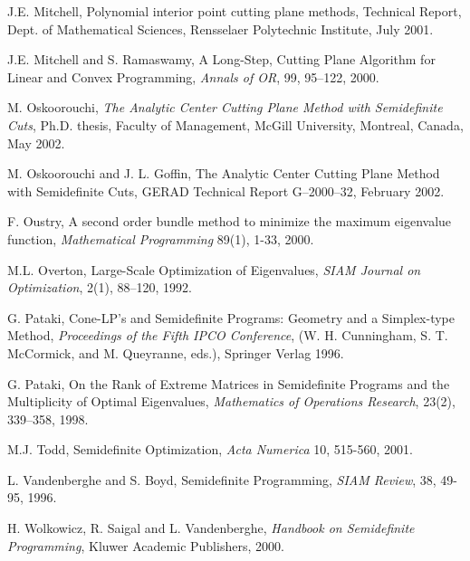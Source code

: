 \documentclass[12pt]{kluwer}
\begin{document}
\begin{article}
\begin{thebibliography}{55}
J.E. Mitchell,
Polynomial interior point cutting plane methods,
Technical Report, Dept. of Mathematical Sciences,
Rensselaer Polytechnic Institute, July 2001.

J.E. Mitchell and S. Ramaswamy,
A Long-Step, Cutting Plane Algorithm for Linear and Convex Programming,
{\em Annals of OR}, 99, 95--122, 2000.

M. Oskoorouchi,
{\em The Analytic Center Cutting Plane Method with Semidefinite Cuts},
Ph.D. thesis,
Faculty of Management, McGill University, Montreal, Canada, May 2002.

M. Oskoorouchi and J. L. Goffin,
The Analytic Center Cutting Plane Method with Semidefinite Cuts,
GERAD Technical Report G--2000--32, February 2002.

 F. Oustry,
A second order bundle method to minimize the maximum eigenvalue function,
{\em Mathematical Programming} 89(1), 1-33, 2000.

 M.L. Overton,
Large-Scale Optimization of Eigenvalues,
{\em SIAM Journal on Optimization},
2(1), 88--120, 1992.

 G. Pataki,
Cone-LP's and Semidefinite Programs: Geometry and a Simplex-type Method,
{\em Proceedings of the Fifth IPCO Conference},
(W. H. Cunningham, S. T. McCormick, and M. Queyranne, eds.),
Springer Verlag 1996.

 G. Pataki,
On the Rank of Extreme Matrices in Semidefinite Programs and the
Multiplicity of Optimal Eigenvalues,
{\em Mathematics of Operations Research}, 23(2), 339--358, 1998.

M.J. Todd, Semidefinite Optimization,
{\em Acta Numerica} 10, 515-560, 2001.

L. Vandenberghe and S. Boyd,
Semidefinite Programming, {\em SIAM Review}, 38, 49-95, 1996.

H. Wolkowicz, R. Saigal and L. Vandenberghe,
{\em Handbook on Semidefinite Programming}, Kluwer Academic Publishers, 2000.
\end{thebibliography}
\end{article}
\end{document}
